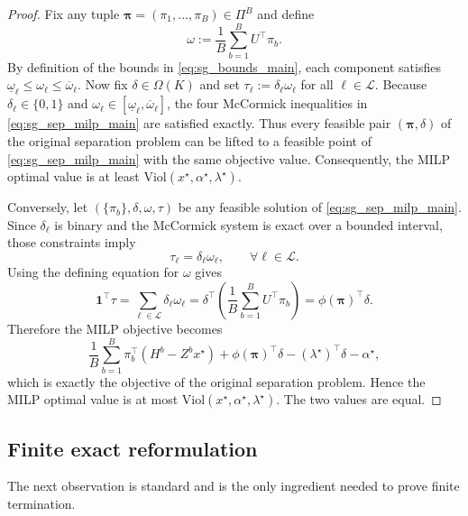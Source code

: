 \begin{proof}
Fix any tuple $\boldsymbol\pi=(\pi_1,\ldots,\pi_B)\in\Pi^B$ and define
\[
\omega:=\frac{1}{B}\sum_{b=1}^B U^\top\pi_b.
\]
By definition of the bounds in \eqref{eq:sg_bounds_main}, each component satisfies
$\underline\omega_\ell\le \omega_\ell\le \overline\omega_\ell$.
Now fix $\delta\in\Omega(K)$ and set $\tau_\ell:=\delta_\ell\omega_\ell$ for all
$\ell\in\mathcal L$.
Because $\delta_\ell\in\{0,1\}$ and $\omega_\ell\in[\underline\omega_\ell,\overline\omega_\ell]$,
the four McCormick inequalities in \eqref{eq:sg_sep_milp_main} are satisfied exactly.
Thus every feasible pair $(\boldsymbol\pi,\delta)$ of the original separation problem can be lifted to a feasible point
of \eqref{eq:sg_sep_milp_main} with the same objective value.
Consequently, the MILP optimal value is at least $\mathrm{Viol}(x^{\star},\alpha^{\star},\lambda^{\star})$.

Conversely, let $(\{\pi_b\},\delta,\omega,\tau)$ be any feasible solution of
\eqref{eq:sg_sep_milp_main}. Since $\delta_\ell$ is binary and the McCormick system is exact over a bounded interval,
those constraints imply
\[
\tau_\ell=\delta_\ell\omega_\ell,
\qquad \forall \ell\in\mathcal L.
\]
Using the defining equation for $\omega$ gives
\[
\mathbf 1^\top\tau
=\sum_{\ell\in\mathcal L}\delta_\ell\omega_\ell
=\delta^\top\left(\frac{1}{B}\sum_{b=1}^B U^\top\pi_b\right)
=\phi(\boldsymbol\pi)^\top\delta.
\]
Therefore the MILP objective becomes
\[
\frac{1}{B}\sum_{b=1}^B \pi_b^\top(H^b-Z^b x^{\star})
+\phi(\boldsymbol\pi)^\top\delta
-(\lambda^{\star})^\top\delta-\alpha^{\star},
\]
which is exactly the objective of the original separation problem.
Hence the MILP optimal value is at most $\mathrm{Viol}(x^{\star},\alpha^{\star},\lambda^{\star})$.
The two values are equal.
\end{proof}

\subsection{Finite exact reformulation}

The next observation is standard and is the only ingredient needed to prove finite termination.

